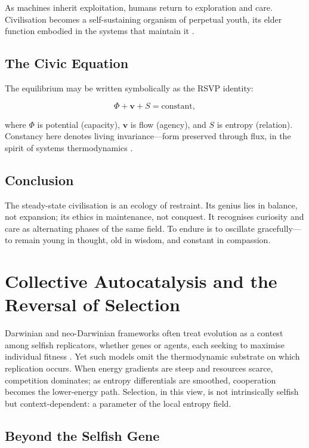 \documentclass[12pt,a4paper]{article}
\begin{document}
As machines inherit exploitation, 
humans return to exploration and care.  
Civilisation becomes a self-sustaining organism of perpetual youth,
its elder function embodied in the systems that maintain it
\citep{capra2021systems,stewart1999evolution}.

\subsection{The Civic Equation}

The equilibrium may be written symbolically as the RSVP identity:

\[
\Phi + \mathbf{v} + S = \mathrm{constant},
\]

where $\Phi$ is potential (capacity), 
$\mathbf{v}$ is flow (agency), 
and $S$ is entropy (relation).
Constancy here denotes living invariance—form preserved through flux,
in the spirit of systems thermodynamics \citep{dalziel2022thermodynamics}.

\subsection*{Conclusion}

The steady-state civilisation is an ecology of restraint.  
Its genius lies in balance, not expansion;  
its ethics in maintenance, not conquest.  
It recognises curiosity and care as alternating phases of the same field.
To endure is to oscillate gracefully—
to remain young in thought, old in wisdom, and constant in compassion.

\section{Collective Autocatalysis and the Reversal of Selection}

Darwinian and neo-Darwinian frameworks often treat evolution as a contest among selfish
replicators, whether genes or agents, each seeking to maximise individual fitness
\citep{boulding1966spaceship}.  
Yet such models omit the thermodynamic substrate on which replication occurs.
When energy gradients are steep and resources scarce, competition dominates;
as entropy differentials are smoothed, cooperation becomes the lower-energy path.
Selection, in this view, is not intrinsically selfish but
context-dependent: a parameter of the local entropy field.

\subsection{Beyond the Selfish Gene}
\end{document}
